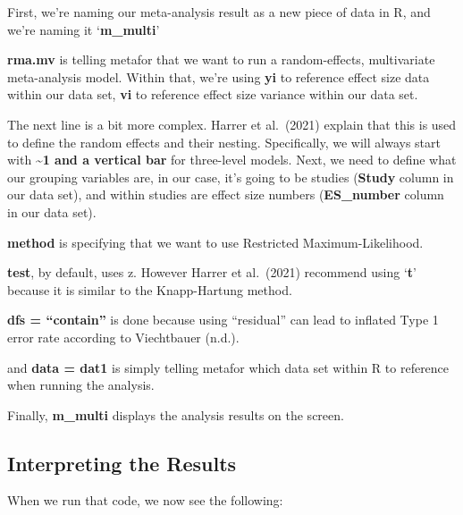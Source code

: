 \documentclass[
]{book}
\begin{document}
First, we're naming our meta-analysis result as a new piece of data in R, and we're naming it `\textbf{m\_multi}'

\textbf{rma.mv} is telling metafor that we want to run a random-effects, multivariate meta-analysis model. Within that, we're using \textbf{yi} to reference effect size data within our data set, \textbf{vi} to reference effect size variance within our data set.

The next line is a bit more complex. Harrer et al.~(2021)\citep{harrer2021} explain that this is used to define the random effects and their nesting. Specifically, we will always start with \textbf{\textasciitilde1 and a vertical bar} for three-level models. Next, we need to define what our grouping variables are, in our case, it's going to be studies (\textbf{Study} column in our data set), and within studies are effect size numbers (\textbf{ES\_number} column in our data set).

\textbf{method} is specifying that we want to use Restricted Maximum-Likelihood.

\textbf{test}, by default, uses z. However Harrer et al.~(2021)\citep{harrer2021} recommend using `\textbf{t}' because it is similar to the Knapp-Hartung method.

\textbf{dfs = ``contain''} is done because using ``residual'' can lead to inflated Type 1 error rate according to Viechtbauer (n.d.)\citep{viechtbauer}.

and \textbf{data = dat1} is simply telling metafor which data set within R to reference when running the analysis.

Finally, \textbf{m\_multi} displays the analysis results on the screen.

\hypertarget{interpreting-the-results-1}{%
\subsection{Interpreting the Results}\label{interpreting-the-results-1}}

When we run that code, we now see the following:
\end{document}
